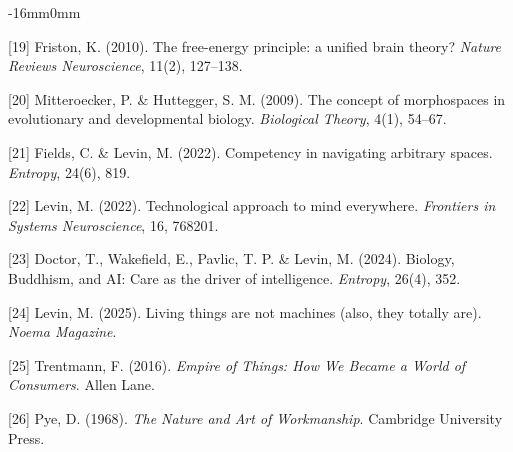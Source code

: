 \documentclass[10pt,oneside]{book}
\newcommand{\refentry}[1]{%
  \par\addvspace{0pt}%
  \begingroup\footnotesize\linespread{0.92}\selectfont
  \noindent\hangindent=4mm\hangafter=1 #1\par%
  \endgroup
}
\newenvironment{widebody}{%
  \begin{adjustwidth}{-16mm}{0mm}%
}{%
  \end{adjustwidth}%
}
\begin{document}
\begin{widebody}
\refentry{[19] Friston, K. (2010). The free-energy principle: a unified brain theory? \textit{Nature Reviews Neuroscience}, 11(2), 127--138.}
\refentry{[20] Mitteroecker, P. \& Huttegger, S. M. (2009). The concept of morphospaces in evolutionary and developmental biology. \textit{Biological Theory}, 4(1), 54--67.}
\refentry{[21] Fields, C. \& Levin, M. (2022). Competency in navigating arbitrary spaces. \textit{Entropy}, 24(6), 819.}
\refentry{[22] Levin, M. (2022). Technological approach to mind everywhere. \textit{Frontiers in Systems Neuroscience}, 16, 768201.}
\refentry{[23] Doctor, T., Wakefield, E., Pavlic, T. P. \& Levin, M. (2024). Biology, Buddhism, and AI: Care as the driver of intelligence. \textit{Entropy}, 26(4), 352.}
\refentry{[24] Levin, M. (2025). Living things are not machines (also, they totally are). \textit{Noema Magazine}.}
\refentry{[25] Trentmann, F. (2016). \textit{Empire of Things: How We Became a World of Consumers}. Allen Lane.}
\refentry{[26] Pye, D. (1968). \textit{The Nature and Art of Workmanship}. Cambridge University Press.}
\end{widebody}
\end{document}
